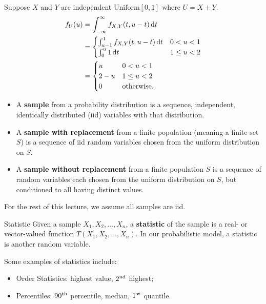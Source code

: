 \begin{Example}{}{}
    Suppose $ X $ and $ Y $ are independent $ \text{Uniform}[0,1] $
    where $ U=X+Y $.
    \tcblower{}
    \begin{align*}
        f_U(u)
         & =\int_{-\infty}^{\infty}f_{X,Y}(t,u-t)\odif{t}   \\
         & =\begin{cases}
                \int_{u-1}^{1}f_{X,Y}(t,u-t)\odif{t} & 0<u<1    \\
                \int_{0}^{u}1\odif{t}                & 1\le u<2
            \end{cases} \\
         & =\begin{cases}
                u   & 0<u<1             \\
                2-u & 1\le u< 2         \\
                0   & \text{otherwise}.
            \end{cases}
    \end{align*}
\end{Example}
\begin{itemize}
    \item A \textbf{sample} from a probability distribution is a sequence, independent,
          identically distributed (iid) variables with that distribution.
    \item A \textbf{sample with replacement} from a finite population (meaning a finite set $ S $)
          is a sequence of iid random variables chosen from the uniform distribution on $ S $.
    \item A \textbf{sample without replacement} from a finite population $ S $ is a sequence of
          random variables each chosen from the uniform distribution on $ S $, but
          conditioned to all having distinct values.
\end{itemize}
For the rest of this lecture, we assume all samples are iid.
\begin{Definition}{Statistic}{}
    Given a sample $ X_1,X_2,\ldots,X_n $, a \textbf{statistic}
    of the sample is a real- or vector-valued function
    $ T(X_1,X_2,\ldots,X_n) $.
    \tcblower{}
    In our probabilistic model, a statistic is another random variable.
\end{Definition}
\begin{Example}{}{}
    Some examples of statistics include:
    \begin{itemize}
        \item Order Statistics: highest value, $ 2\textsuperscript{nd} $ highest;
        \item Percentiles: $ 90\textsuperscript{th} $ percentile, median, $ 1\textsuperscript{st} $ quantile.
    \end{itemize}
\end{Example}
